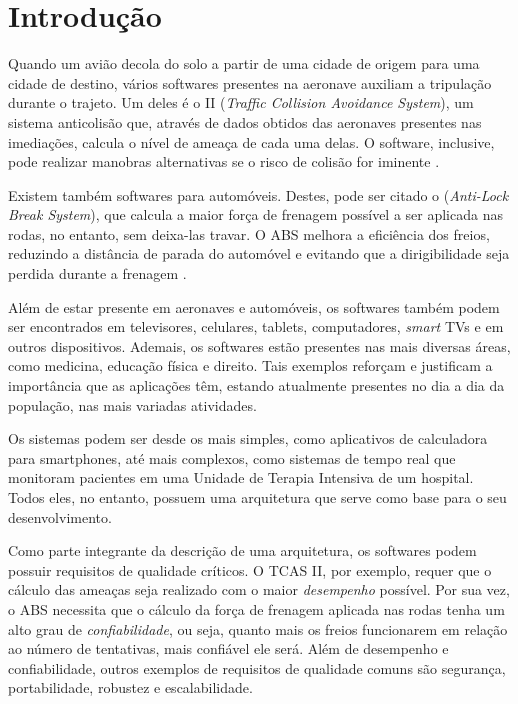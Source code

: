 \chapter{Introdução} \label{ch:introducao}

Quando um avião decola do solo a partir de uma cidade de origem para uma cidade de destino, vários softwares presentes na aeronave auxiliam a tripulação durante o trajeto. Um deles é o II (\textit{Traffic Collision Avoidance System}), um sistema anticolisão que, através de dados obtidos das aeronaves presentes nas imediações, calcula o nível de ameaça de cada uma delas. O software, inclusive, pode realizar manobras alternativas se o risco de colisão for iminente \cite{Williamson1989}.

Existem também softwares para automóveis. Destes, pode ser citado o (\textit{Anti-Lock Break System}), que calcula a maior força de frenagem possível a ser aplicada nas rodas, no entanto, sem deixa-las travar. O ABS melhora a eficiência dos freios, reduzindo a distância de parada do automóvel e evitando que a dirigibilidade seja perdida durante a frenagem \cite{burckhardt1989anti}.

Além de estar presente em aeronaves e automóveis, os softwares também podem ser encontrados em televisores, celulares, tablets, computadores, \textit{smart} TVs e em outros dispositivos. Ademais, os softwares estão presentes nas mais diversas áreas, como medicina, educação física e direito. Tais exemplos reforçam e justificam a importância que as aplicações têm, estando atualmente presentes no dia a dia da população, nas mais variadas atividades.

Os sistemas podem ser desde os mais simples, como aplicativos de calculadora para smartphones, até mais complexos, como sistemas de tempo real que monitoram pacientes em uma Unidade de Terapia Intensiva de um hospital. Todos eles, no entanto, possuem uma arquitetura que serve como base para o seu desenvolvimento.

Como parte integrante da descrição de uma arquitetura, os softwares podem possuir requisitos de qualidade críticos. O TCAS II, por exemplo, requer que o cálculo das ameaças seja realizado com o maior \textit{desempenho} possível. Por sua vez, o ABS necessita que o cálculo da força de frenagem aplicada nas rodas tenha um alto grau de \textit{confiabilidade}, ou seja, quanto mais os freios funcionarem em relação ao número de tentativas, mais confiável ele será. Além de desempenho e confiabilidade, outros exemplos de requisitos de qualidade comuns são segurança, portabilidade, robustez e escalabilidade.

